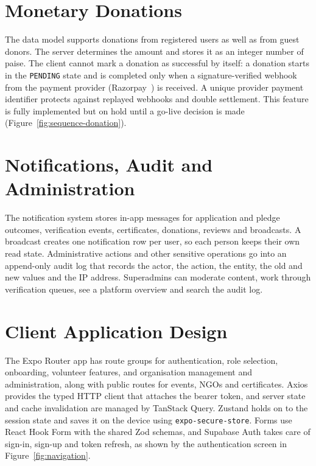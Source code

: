 \section{Monetary Donations}
\label{sec:impl-donations}
The data model supports donations from registered users as well as from guest donors. The server determines the amount and stores it as an integer number of paise. The client cannot mark a donation as successful by itself: a donation starts in the \texttt{PENDING} state and is completed only when a signature-verified webhook from the payment provider (Razorpay~\cite{razorpay}) is received. A unique provider payment identifier protects against replayed webhooks and double settlement. This feature is fully implemented but on hold until a go-live decision is made (Figure~\ref{fig:sequence-donation}).


\section{Notifications, Audit and Administration}
\label{sec:impl-notifications}
The notification system stores in-app messages for application and pledge outcomes, verification events, certificates, donations, reviews and broadcasts. A broadcast creates one notification row per user, so each person keeps their own read state. Administrative actions and other sensitive operations go into an append-only audit log that records the actor, the action, the entity, the old and new values and the IP address. Superadmins can moderate content, work through verification queues, see a platform overview and search the audit log.

\section{Client Application Design}
\label{sec:impl-client}
The Expo Router app has route groups for authentication, role selection, onboarding, volunteer features, and organisation management and administration, along with public routes for events, NGOs and certificates. Axios provides the typed HTTP client that attaches the bearer token, and server state and cache invalidation are managed by TanStack Query. Zustand holds on to the session state and saves it on the device using \texttt{expo-secure-store}. Forms use React Hook Form with the shared Zod schemas, and Supabase Auth takes care of sign-in, sign-up and token refresh, as shown by the authentication screen in Figure~\ref{fig:navigation}.

